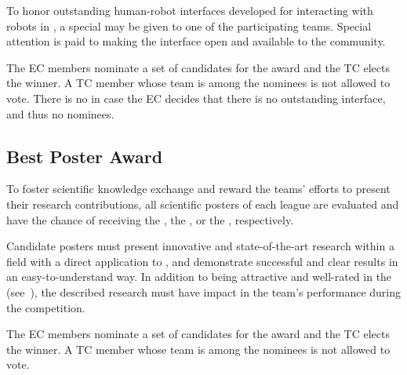 To honor outstanding human-robot interfaces developed for interacting with robots in \AtHome{}, a special \HRIAward{} may be given to one of the participating teams.
Special attention is paid to making the interface open and available to the \AtHome{} community.

The \AtHome{} EC members nominate a set of candidates for the award and the TC elects the winner.
A TC member whose team is among the nominees is not allowed to vote.
There is no \HRIAward{} in case the EC decides that there is no outstanding interface, and thus no nominees.

\subsection{Best Poster Award}
\label{award:poster}

To foster scientific knowledge exchange and reward the teams' efforts to present their research contributions, all scientific posters of each league are evaluated and have the chance of receiving the \DSPLPosterAward, the \OPLPosterAward, or the \SSPLPosterAward, respectively.

Candidate posters must present innovative and state-of-the-art research within a field with a direct application to \AtHome, and demonstrate successful and clear results in an easy-to-understand way.
In addition to being attractive and well-rated in the \PS{} (see~), the described research must have impact in the team's performance during the competition.

The \AtHome{} EC members nominate a set of candidates for the award and the TC elects the winner.
A TC member whose team is among the nominees is not allowed to vote.

%
%
%

